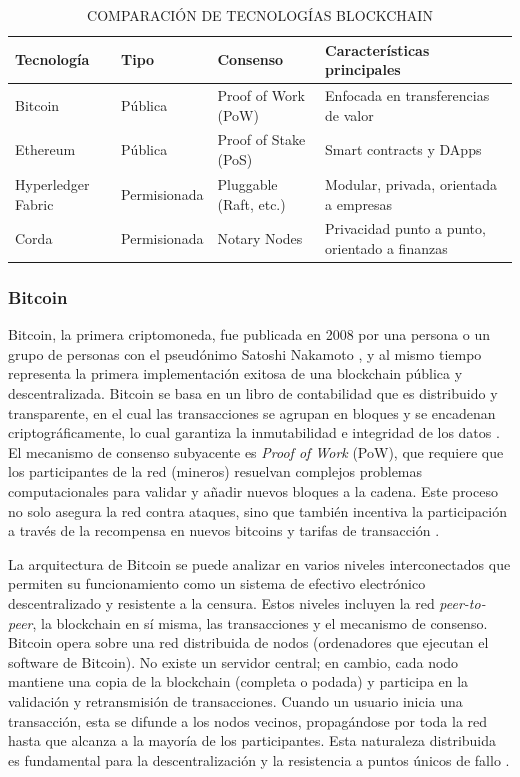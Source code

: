 \newpage
\begin{table}[h!]
\centering
\captionsetup{list=no} %
\caption{COMPARACIÓN DE TECNOLOGÍAS BLOCKCHAIN}
\label{tab:comparacion_blockchains}
\begin{tabularx}{\textwidth}{l l l X}
\toprule
\textbf{Tecnología} & \textbf{Tipo} & \textbf{Consenso} & \textbf{Características principales} \\
\midrule
Bitcoin & Pública & Proof of Work (PoW) & Enfocada en transferencias de valor \cite{Narayanan2016} \\
Ethereum & Pública & Proof of Stake (PoS) & Smart contracts y DApps \cite{EthereumWhitePaper} \\
Hyperledger Fabric & Permisionada & Pluggable (Raft, etc.) & Modular, privada, orientada a empresas \cite{HyperledgerFabric} \\
Corda & Permisionada & Notary Nodes & Privacidad punto a punto, orientado a finanzas \cite{R3Corda2021} \\
\bottomrule
\end{tabularx}
\end{table}

\subsubsection{Bitcoin}
Bitcoin, la primera criptomoneda, fue publicada en 2008 por una persona o un grupo de personas con el pseudónimo Satoshi Nakamoto \cite{nakamoto2008bitcoin}, y al mismo tiempo representa la primera implementación exitosa de una blockchain pública y descentralizada. Bitcoin se basa en un libro de contabilidad que es distribuido y transparente, en el cual las transacciones se agrupan en bloques y se encadenan criptográficamente, lo cual garantiza la inmutabilidad e integridad de los datos \cite{Antonopoulos2014}. El mecanismo de consenso subyacente es \textit{Proof of Work} (PoW), que requiere que los participantes de la red (mineros) resuelvan complejos problemas computacionales para validar y añadir nuevos bloques a la cadena. Este proceso no solo asegura la red contra ataques, sino que también incentiva la participación a través de la recompensa en nuevos bitcoins y tarifas de transacción \cite{Narayanan2016}.

La arquitectura de Bitcoin se puede analizar en varios niveles interconectados que permiten su funcionamiento como un sistema de efectivo electrónico descentralizado y resistente a la censura. Estos niveles incluyen la red \textit{peer-to-peer}, la blockchain en sí misma, las transacciones y el mecanismo de consenso. Bitcoin opera sobre una red distribuida de nodos (ordenadores que ejecutan el software de Bitcoin). No existe un servidor central; en cambio, cada nodo mantiene una copia de la blockchain (completa o podada) y participa en la validación y retransmisión de transacciones. Cuando un usuario inicia una transacción, esta se difunde a los nodos vecinos, propagándose por toda la red hasta que alcanza a la mayoría de los participantes. Esta naturaleza distribuida es fundamental para la descentralización y la resistencia a puntos únicos de fallo \cite{Swan2015}.

